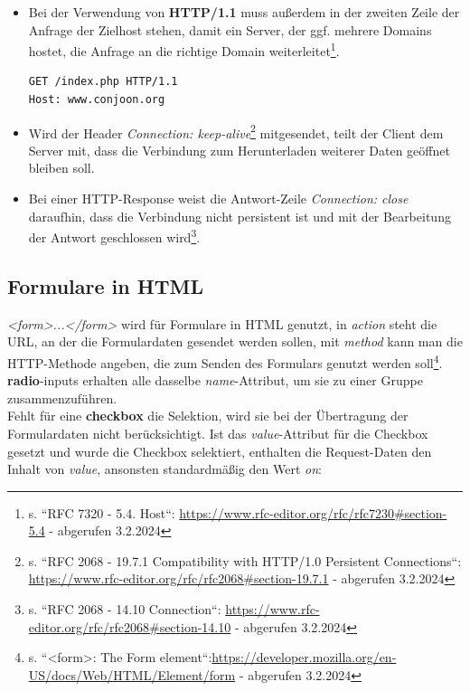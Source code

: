 \begin{itemize}
    \item Bei der Verwendung von \textbf{HTTP/1.1} muss außerdem in der zweiten Zeile der Anfrage der Zielhost stehen, damit ein Server, der {ggf.} mehrere Domains hostet, die Anfrage an die richtige Domain weiterleitet\footnote{s. ``RFC 7320 - 5.4.  Host``: \url{https://www.rfc-editor.org/rfc/rfc7230#section-5.4} - abgerufen 3.2.2024}.
    \begin{verbatim}
GET /index.php HTTP/1.1
Host: www.conjoon.org
    \end{verbatim}
    \item Wird der Header \textit{Connection: keep-alive}\footnote{
    s. ``RFC 2068 - 19.7.1 Compatibility with HTTP/1.0 Persistent Connections``: \url{https://www.rfc-editor.org/rfc/rfc2068#section-19.7.1} - abgerufen 3.2.2024
    } mitgesendet, teilt der Client dem Server mit, dass die Verbindung zum Herunterladen weiterer Daten geöffnet bleiben soll.
    \item Bei einer HTTP-Response weist die Antwort-Zeile \textit{Connection: close} daraufhin, dass die Verbindung nicht persistent ist und mit der Bearbeitung der Antwort geschlossen wird\footnote{
    s. ``RFC 2068 - 14.10 Connection``: \url{https://www.rfc-editor.org/rfc/rfc2068#section-14.10} - abgerufen 3.2.2024
    }.
\end{itemize}

\subsection{Formulare in HTML}

\textit{<form>...</form>} wird für Formulare in HTML genutzt, in \textit{action} steht die URL, an der die Formulardaten gesendet werden sollen, mit \textit{method} kann man die HTTP-Methode angeben, die zum Senden des Formulars genutzt werden soll\footnote{
s. ``<form>: The Form element``:\url{https://developer.mozilla.org/en-US/docs/Web/HTML/Element/form} - abgerufen 3.2.2024
}.\\

\noindent
\textbf{radio}-inputs erhalten alle dasselbe \textit{name}-Attribut, um sie zu einer Gruppe zusammenzuführen.\\

\noindent
Fehlt für eine \textbf{checkbox} die Selektion, wird sie bei der Übertragung der Formulardaten nicht berücksichtigt.
Ist das \textit{value}-Attribut für die Checkbox gesetzt und wurde die Checkbox selektiert, enthalten die Request-Daten den Inhalt von \textit{value}, ansonsten standardmäßig den Wert \textit{on}:

